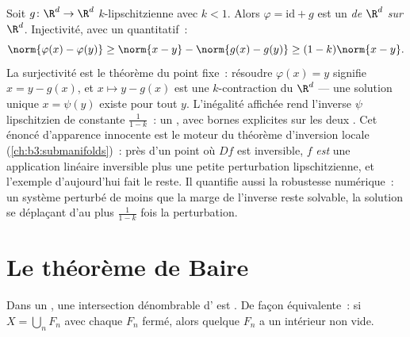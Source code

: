\begin{example}
\label{ex:b3:complete:perturbident}
Soit $g \colon \R^d \to \R^d$ $k$-lipschitzienne avec $k < 1$.
Alors $\varphi = \mathrm{id} + g$ est un \emph{
de $\R^d$ sur $\R^d$}. Injectivité, avec un  quantitatif~:
\[
\norm{\varphi(x) - \varphi(y)} \geq \norm{x - y} -
\norm{g(x) - g(y)} \geq (1 - k)\norm{x - y} .
\]
La surjectivité est le théorème du point fixe~: résoudre
$\varphi(x) = y$ signifie $x = y - g(x)$, et $x \mapsto y -
g(x)$ est une $k$-contraction du  $\R^d$ --- une
solution unique $x = \psi(y)$ existe pour tout $y$.
L'inégalité affichée rend l'inverse $\psi$ lipschitzien de
constante $\frac1{1-k}$~: un , avec bornes
explicites sur les deux . Cet énoncé d'apparence
innocente est le moteur du théorème d'inversion locale
(\cref{ch:b3:submanifolds})~: près d'un point où $Df$ est
inversible, $f$ \emph{est} une application linéaire inversible
plus une petite perturbation lipschitzienne, et l'exemple
d'aujourd'hui fait le reste. Il quantifie aussi la robustesse
numérique~: un système perturbé de moins que la marge de
l'inverse reste solvable, la solution se déplaçant d'au plus
$\frac{1}{1-k}$ fois la perturbation.
\end{example}

\section{Le théorème de Baire}

\begin{theorem}[Baire]\label{thm:b3:complete:baire}
Dans un , une intersection dénombrable
d'  est . De façon équivalente~: si $X =
\bigcup_{n}F_n$ avec chaque $F_n$ fermé, alors quelque $F_n$ a
un intérieur non vide.
\end{theorem}

